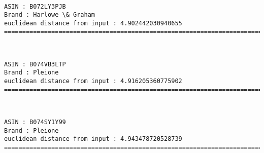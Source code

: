 \documentclass[11pt]{article}
\begin{document}
    
    
    \begin{center}
    \end{center}
    { \hspace*{\fill} \\}
    
    \begin{Verbatim}[commandchars=\\\{\}]
ASIN : B072LY3PJB
Brand : Harlowe \& Graham
euclidean distance from input : 4.902442030940655
=============================================================================================================================

    \end{Verbatim}

    
    
    \begin{center}
    \end{center}
    { \hspace*{\fill} \\}
    
    \begin{Verbatim}[commandchars=\\\{\}]
ASIN : B074VB3LTP
Brand : Pleione
euclidean distance from input : 4.916205360775902
=============================================================================================================================

    \end{Verbatim}

    
    
    \begin{center}
    \end{center}
    { \hspace*{\fill} \\}
    
    \begin{Verbatim}[commandchars=\\\{\}]
ASIN : B074SY1Y99
Brand : Pleione
euclidean distance from input : 4.943478720528739
=============================================================================================================================

    \end{Verbatim}
\end{document}
